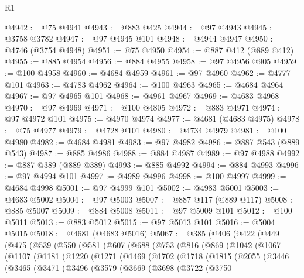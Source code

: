 \begin{lexlean}{R1}
\begin{coremodule}
@4942 := @75 @4941
@4943 := @883 @425
@4944 := @97 @4943
@4945 := @3758 @3782
@4947 := @97 @4945 @101
@4948 := @4944 @4947
@4950 := @4746 (@3754 @4948)
@4951 := @75 @4950
@4954 := @887 @412 (@889 @412)
@4955 := @885 @4954
@4956 := @884 @4955
@4958 := @97 @4956 @905
@4959 := @100 @4958
@4960 := @4684 @4959
@4961 := @97 @4960
@4962 := @4777 @101
@4963 := @4783 @4962
@4964 := @100 @4963
@4965 := @4684 @4964
@4967 := @97 @4965 @101
@4968 := @4961 @4967
@4969 := @4683 @4968
@4970 := @97 @4969
@4971 := @100 @4805
@4972 := @883 @4971
@4974 := @97 @4972 @101
@4975 := @4970 @4974
@4977 := @4681 (@4683 @4975)
@4978 := @75 @4977
@4979 := @4728 @101
@4980 := @4734 @4979
@4981 := @100 @4980
@4982 := @4684 @4981
@4983 := @97 @4982
@4986 := @887 @543 (@889 @543)
@4987 := @885 @4986
@4988 := @884 @4987
@4989 := @97 @4988
@4992 := @887 @389 (@889 @389)
@4993 := @885 @4992
@4994 := @884 @4993
@4996 := @97 @4994 @101
@4997 := @4989 @4996
@4998 := @100 @4997
@4999 := @4684 @4998
@5001 := @97 @4999 @101
@5002 := @4983 @5001
@5003 := @4683 @5002
@5004 := @97 @5003
@5007 := @887 @117 (@889 @117)
@5008 := @885 @5007
@5009 := @884 @5008
@5011 := @97 @5009 @101
@5012 := @100 @5011
@5013 := @883 @5012
@5015 := @97 @5013 @101
@5016 := @5004 @5015
@5018 := @4681 (@4683 @5016)
@5067 := @385
    (@406
      (@422
        (@449
          (@475
            (@539
              (@550
                (@581
                  (@607
                    (@688
                      (@753
                        (@816
                          (@869
                            (@1042
                              (@1067
                                (@1107
                                  (@1181
                                    (@1220
                                      (@1271
                                        (@1469
                                          (@1702
                                            (@1718
                                              (@1815
                                                (@2055
                                                  (@3446
                                                    (@3465
                                                      (@3471
                                                        (@3496
                                                          (@3579
                                                            (@3669
                                                              (@3698
                                                                (@3722
                                                                  (@3750

\end{coremodule}
\end{lexlean}
